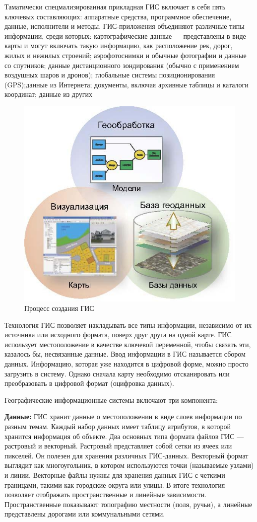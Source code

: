 \documentclass[732,fontsize=14pt,final]{studrep}
\begin{document}
Таматически спецмализированная прикладная ГИС включает в себя пять ключевых составляющих: аппаратные средства, программное обеспечение, данные, исполнители и методы. ГИС-приложения объединяют различные типы информации, среди которых: картографические данные — представлены в виде карты и могут включать такую информацию, как расположение рек, дорог, жилых и нежилых строений; аэрофотоснимки и обычные фотографии и данные со спутников; данные дистанционного зондирования (обычно с применением воздушных шаров и дронов); глобальные системы позиционирования (GPS);данные из Интернета; документы, включая архивные таблицы и каталоги координат; данные из других

  \begin{figure}[htp]
	\centering
	\includegraphics[width=0.7\linewidth]{pics/image15.png}
    \caption{Процесс создания ГИС}
    \label{fig:gis-design-process}
  \end{figure}

Технология ГИС позволяет накладывать все типы информации, независимо от их источника или исходного формата, поверх друг друга на одной карте. ГИС использует местоположение в качестве ключевой переменной, чтобы связать эти, казалось бы, несвязанные данные.
Ввод информации в ГИС называется сбором данных. Информацию, которая уже находится в цифровой форме, можно просто загрузить в систему. Однако сначала карту необходимо отсканировать или преобразовать в цифровой формат (оцифровка данных).

Географические информационные системы включают три компонента:

\textbf{Данные:} ГИС хранит данные о местоположении в виде слоев информации по разным темам. Каждый набор данных имеет таблицу атрибутов, в которой хранится информация об объекте. Два основных типа формата файлов ГИС — растровый и векторный. Растровый представляет собой сетки из ячеек или пикселей. Он полезен для хранения различных ГИС-данных. Векторный формат выглядит как многоугольник, в котором используются точки (называемые узлами) и линии. Векторные файлы нужны для хранения данных ГИС с четкими границами, такими как городские округа или улицы. В итоге технология позволяет отображать пространственные и линейные зависимости. Пространственные показывают топографию местности (поля, ручьи), а линейные представлены дорогами или коммунальными сетями.
\end{document}
